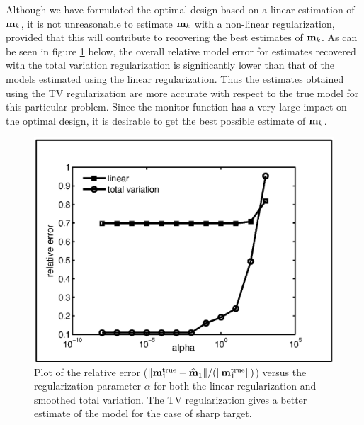 \documentclass[final,leqno,onefignum,onetabnum]{siamltexmm}
\begin{document}
Although we have formulated the optimal design based on a linear estimation of ${\bf{m}}_k$, it is not unreasonable to estimate ${\bf{m}}_k$  with a non-linear regularization, provided that this will contribute to recovering the best estimates of ${\bf{m}}_k$. As can be seen in figure \ref{fig:erro1} below, the overall relative model error for estimates recovered with the total variation regularization is significantly lower than that of the models estimated using the linear regularization. Thus the estimates obtained using the TV regularization are more accurate with respect to the true model for this particular problem. 
Since the monitor function has a very large impact on the optimal design, it is desirable to get the best possible estimate of ${\bf{m}}_k$. 
\begin{figure}
\begin{center}
\iwidth=180mm
\includegraphics[width=.65\iwidth]{figures/regFigs/regCompare.eps}
\end{center}
\caption{Plot of the relative error ($\|{\bf{m}}_1^{\rm true}-{\widehat{{\bf{m}}}}_1\|/(    \|{\bf{m}}^{\rm true}_1\|)$) versus the regularization parameter $\alpha$ for both the linear regularization and smoothed total variation. 
The TV regularization gives a better estimate of the model for the case of sharp target.
}
\label{fig:erro1}
\end{figure} 

\end{document}
